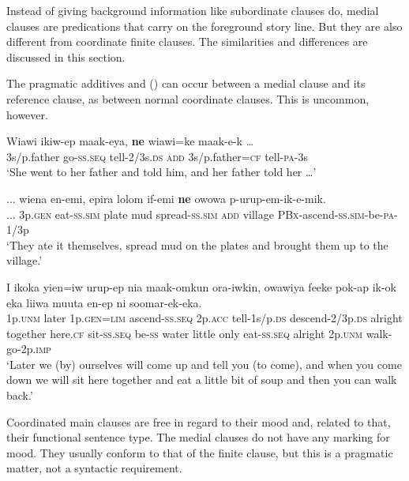 Instead of giving background information like subordinate clauses do, medial clauses are predications that carry on the foreground story line. But they are also different from coordinate finite clauses. The similarities and differences are discussed in this section.

The pragmatic additives  and  () can occur between a medial clause and its reference clause, as between normal coordinate clauses. This is uncommon, however.

\ea%
\label{ex:x1444}
\gll Wiawi  ikiw-ep  maak-eya,  \textbf{ne}  wiawi=ke  maak-e-k  {\dots} \\
3s/p.father  go-\textsc{ss}.\textsc{seq} tell-2/3s.\textsc{ds} \textsc{add}  3s/p.father=\textsc{cf} tell-\textsc{pa}-3s\\
\glt`She went to her father and told him, and her father told her {\dots}'
\z


\ea%
\label{ex:x1445}
\gll ...  wiena  en-emi,  epira  lolom  if-emi  \textbf{ne}  owowa p-urup-em-ik-e-mik.\\
...  3p.\textsc{gen} eat-\textsc{ss}.\textsc{sim} plate  mud  spread-\textsc{ss}.\textsc{sim} \textsc{add} village \textsc{PBx}-ascend-\textsc{ss}.\textsc{sim}-be-\textsc{pa}-1/3p\\
\glt`They ate it themselves, spread mud on the plates and brought them up to the village.'
\z


\ea%
\label{ex:x1442}
\gll I  ikoka  yien=iw  urup-ep  nia  maak-omkun ora-iwkin,    owawiya  feeke  pok-ap  ik-ok  eka liiwa  muuta  en-ep    ni  soomar-ek-eka.\\
1p.\textsc{unm} later 1p.\textsc{gen}=\textsc{lim} ascend-\textsc{ss}.\textsc{seq} 2p.\textsc{acc} tell-1s/p.\textsc{ds} descend-2/3p.\textsc{ds} alright together here.\textsc{cf} sit-\textsc{ss}.\textsc{seq} be-\textsc{ss} water little  only  eat-\textsc{ss}.\textsc{seq} alright  2p.\textsc{unm} walk-go-2p.\textsc{imp}\\
\glt`Later we (by) ourselves will come up and tell you (to come), and when you come down we will sit here together and eat a little bit of soup and then you can walk back.'
\z


Coordinated main clauses are free in regard to their mood and, related to that, their functional sentence type. The medial clauses do not have any marking for mood.  They usually conform to that of the finite clause, but this is a pragmatic matter, not a syntactic requirement. 

